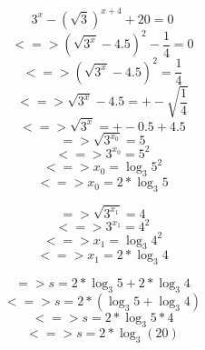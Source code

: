 \documentclass[parskip=full]{scrartcl}
\begin{document}
\[3^x - (\sqrt{3})^{x+4} + 20 = 0\]
\[<=> (\sqrt{3^x} - 4.5)^2 - \frac{1}{4} = 0\]
\[<=> (\sqrt{3^x} - 4.5)^2 = \frac{1}{4}\]
\[<=> \sqrt{3^x} - 4.5 = +-\sqrt{\frac{1}{4}}\]
\[<=> \sqrt{3^x} = +-0.5 + 4.5\]
\[	=> \sqrt{3^{x_0}} = 5\]
\[	<=> 3^{x_0} = 5^2\]
\[	<=> x_0 = \log_3{5^2}\]
\[	<=> x_0 = 2 * \log_3{5}\]

\[	=> \sqrt{3^{x_1}} = 4\]
\[	<=> 3^{x_1} = 4^2\]
\[	<=> x_1 = \log_3{4^2}\]
\[	<=> x_1 = 2 * \log_3{4}\]

\[=> s = 2 * \log_3{5} + 2 * \log_3{4}\]
\[<=> s = 2 * (\log_3{5} + \log_3{4})\]
\[<=> s = 2 * \log_3{5*4}\]
\[<=> s = 2 * \log_3(20)\]
\end{document}
